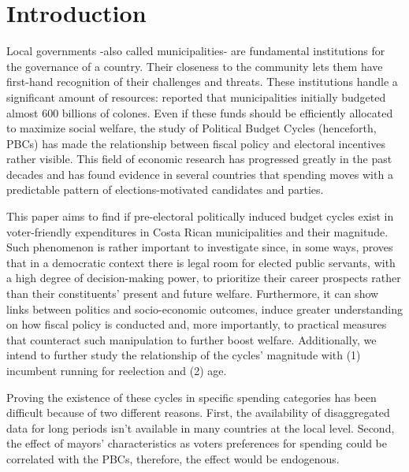 \newpage
\setcounter{page}{1}

\section{Introduction}

Local governments -also called municipalities- are fundamental institutions for the governance of a country. Their closeness to the community lets them have first-hand recognition of their challenges and threats. These institutions handle a significant amount of resources: \textcite{cgr2020} reported that municipalities initially budgeted almost 600 billions of colones. Even if these funds should be efficiently allocated to maximize social welfare, the study of Political Budget Cycles (henceforth, PBCs) has made the relationship between fiscal policy and electoral incentives rather visible. This field of economic research has progressed greatly in the past decades and has found evidence in several countries that spending moves with a predictable pattern of elections-motivated candidates and parties. \parencite{chortareas2016,drazen2010}

This paper aims to find if pre-electoral politically induced budget cycles exist in voter-friendly expenditures in Costa Rican municipalities and their magnitude. Such phenomenon is rather important to investigate since, in some ways, proves that in a democratic context there is legal room for elected public servants, with a high degree of decision-making power, to prioritize their career prospects rather than their constituents' present and future welfare. Furthermore, it can show links between politics and socio-economic outcomes, induce greater understanding on how fiscal policy is conducted and, more importantly, to practical measures that counteract such manipulation to further boost welfare. Additionally, we intend to further study the relationship of the cycles’ magnitude with (1) incumbent running for reelection and (2) age. \textcite{alesina2018,chortareas2016}

Proving the existence of these cycles in specific spending categories has been difficult because of two different reasons.  First, the availability of disaggregated data for long periods isn’t available in many countries at the local level. Second, the effect of mayors’ characteristics as voters preferences for spending could be correlated with the PBCs, therefore, the effect would be endogenous. 

